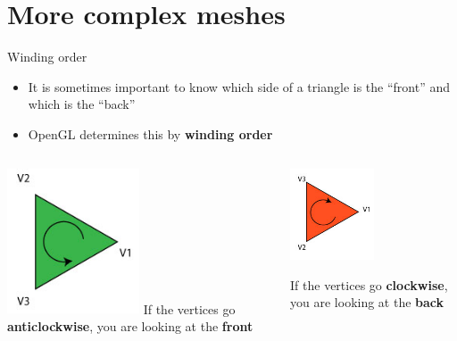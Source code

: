 \part{More complex meshes}
\frame{\partpage}

\begin{frame}{Winding order}
	\begin{itemize}
		\pause\item It is sometimes important to know which side of a triangle is the ``front'' and which is the ``back''
		\pause\item OpenGL determines this by \textbf{winding order}
	\end{itemize}
	\begin{columns}
		\pause
		\begin{column}{0.48\textwidth}
			\begin{center}
				\includegraphics[width=0.5\textwidth]{winding_ccw}
				If the vertices go \textbf{anticlockwise}, you are looking at the \textbf{front}
			\end{center}
		\end{column}
		\pause
		\begin{column}{0.48\textwidth}
			\begin{center}
				\includegraphics[width=0.5\textwidth]{winding_cw}
				
				If the vertices go \textbf{clockwise}, you are looking at the \textbf{back}
			\end{center}
		\end{column}
	\end{columns}
\end{frame}

